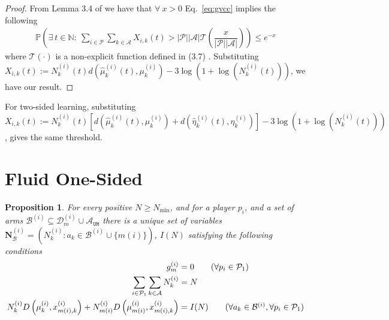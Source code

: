 \documentclass{article}
\newtheorem{proposition}[theorem]{Proposition}
\begin{document}
\begin{proof} From Lemma 3.4 of \cite{kaufmann2020contributions} we have that
$\forall \ x>0$ Eq.~\ref{eq:gvcc} implies the following
    \begin{align*}
    \mathbb{P}\left(\exists\ t\in \mathbb{N}:\ \sum_{i\in\mathcal{P}}\sum_{k\in \mathcal{A}}X_{i,k}(t)>|\mathcal{P}||\mathcal{A}|\mathcal{T}\left(\dfrac{x}{|\mathcal{P}||\mathcal{A}|}\right)\right) \leq e^{-x}
\end{align*}
where $\mathcal{T}(\cdot)$ is a non-explicit function defined in (3.7) \cite{kaufmann2020contributions}.  Substituting $ X_{i,k}(t):= N^{(i)}_k(t) d(\hat{\mu}^{(i)}_k(t),\mu^{(i)}_k)-3\log\left(1+\log\left(N^{(i)}_k(t)\right)\right)$, we have our result. 
\end{proof}

\begin{center}
\end{center}

    
For two-sided learning,  substituting $ X_{i,k}(t):= N^{(i)}_k(t) [d(\hat{\mu}^{(i)}_k(t),\mu^{(i)}_k)+d(\hat{\eta}^{(i)}_k(t),\eta^{(i)}_k)]-3\log\left(1+\log\left(N^{(i)}_k(t)\right)\right)$, gives the same threshold. 





















\section{Fluid One-Sided}
\begin{proposition}
For every positive $N\geq N_{\min}$, and for a player $p_i$, and a set of arms $\mathcal{B}^{(i)}\subseteq\mathcal{D}_m^{(i)}\cup\mathcal{A}_{\texttt{UM}}$ there is a unique set of variables $\bm{N}^{(i)}_{\mathcal{B}} = \left(N^{(i)}_k: a_k\in\mathcal{B}^{(i)}\cup\{m(i)\}\right)$, $I(N)$ satisfying the following conditions
\begin{align*}
    g^{(i)}_m &= 0\tag{$\forall p_i\in\mathcal{P}_{1}$}\\
    \sum_{i\in\mathcal{P}_1}\sum_{k\in\mathcal{A}}N^{(i)}_k &= N\\ 
    N^{(i)}_{k}D\left(\mu^{(i)}_{k},x^{(i)}_{m(i),k}\right)+N^{(i)}_{m(i)}D\left(\mu^{(i)}_{m(i)},x^{(i)}_{m(i),k}\right) &=I(N)\tag{$\forall a_k\in\mathcal{B}^{(i)},\forall p_i\in\mathcal{P}_{1}$}
\end{align*}


\end{proposition}
\end{document}
